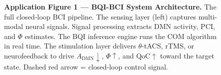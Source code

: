 \documentclass[12pt,a4paper]{article}
\theoremstyle{plain}
\theoremstyle{definition}
\theoremstyle{remark}
\begin{document}
\begin{figure}[H]
\caption{\textbf{Application Figure 1 — BQI-BCI System Architecture.}
  The full closed-loop BCI pipeline.  The sensing layer (left) captures multi-modal
  neural signals.  Signal processing extracts DMN activity, PCI, and $\Phi$ estimates.
  The BQI inference engine runs the COM algorithm in real time.  The stimulation
  layer delivers $\theta$-tACS, rTMS, or neurofeedback to drive
  $A_\mathrm{DMN}\!\downarrow$, $\Phi\!\uparrow$, and $\mathrm{QoC}\!\uparrow$
  toward the target state.  Dashed red arrow = closed-loop control signal.}
\label{fig:bci_architecture}
\end{figure}
\end{document}
